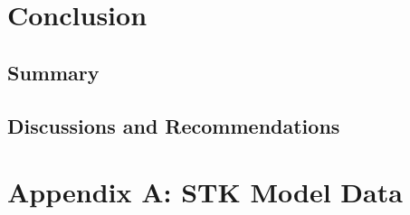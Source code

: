 \section{Conclusion}
\subsection{Summary}
\subsection{Discussions and Recommendations}

\pagebreak
%   
%
%
%
%
\printbibliography[heading=none]

\section{Appendix A: STK Model Data}

